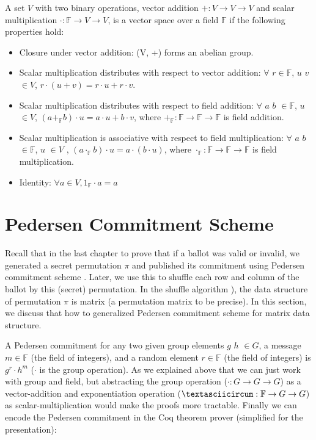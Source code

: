  

\begin{definition}
A set $V$ with two binary operations,  vector addition $+ : V \rightarrow V \rightarrow V$  and scalar multiplication $\cdot : \mathbb{F}  \rightarrow V \rightarrow V$, 
is  a vector space over a field $\mathbb{F}$ if the following properties hold:
\end{definition} 
\begin{itemize}
 \item Closure under vector addition: (V, +) forms an abelian group. 
 \item Scalar multiplication distributes  with respect  to  vector  addition: $\forall$  $r \in \mathbb{F}$, $u$ $v$ $\in V$,  $r \cdot (u + v) = r \cdot u + r \cdot v$.
 \item Scalar multiplication distributes with respect to field addition: 
                $\forall$  $a$ $b$ $\in \mathbb{F}$, $u$ $\in V$, $(a +_{\mathbb{F}} b) \cdot u = a \cdot u + b \cdot v$, where $+_{\mathbb{F}} : \mathbb{F} \to \mathbb{F} \to \mathbb{F} $ is 
                field addition. 
  \item Scalar multiplication is associative with respect to field multiplication:
         $\forall$ $a$ $b$ $\in  \mathbb{F}$, $u$ $\in V$ , $(a \cdot_{\mathbb{F}} b) \cdot u = a \cdot (b \cdot u)$, where $\cdot_{\mathbb{F}} : \mathbb{F} \to \mathbb{F} \to \mathbb{F} $ is 
                field  multiplication. 
  \item Identity: $\forall a \in V, 1_{\mathbb{F}} \cdot a = a$

\end{itemize}



\section{Pedersen Commitment Scheme}
\label{sec:pedersen}
Recall that in the last chapter to prove that if a ballot was valid or invalid, we generated a secret permutation $\pi$ and published its commitment using 
Pedersen commitment scheme \citep{Pederson}.  Later, we use this to shuffle each row and column of the ballot by this (secret) permutation. 
In the shuffle algorithm \citep{Wikstrom:2009:CPS}), the data structure of permutation $\pi$ is matrix (a permutation matrix to be precise).
In this section, we discuss that how to generalized Pedersen commitment scheme for matrix data structure. 

A Pedersen commitment for any two given group elements $g$ $h$ $\in G$, a message $m \in \mathbb{F}$ (the field of integers), and a random element 
$r \in \mathbb{F}$ (the field of integers) is $g^r \cdot h^m$ ($\cdot$ is the group operation).   
As we explained above that we can just work with group and field, but abstracting the group operation ($\cdot : G \to G \to G$) as 
a vector-addition and exponentiation operation ($\textasciicircum : \mathbb{F} \to G \to G$) as scalar-multiplication would make the 
proofs more tractable.  Finally we can encode the Pedersen commitment in the Coq 
theorem prover (simplified for the presentation):

